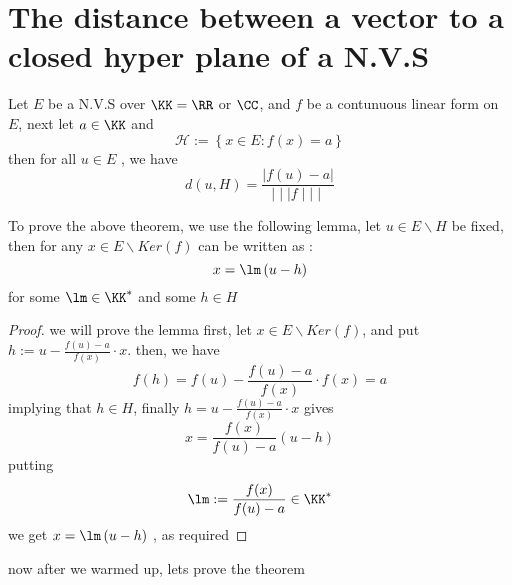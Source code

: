 \section{The distance between a vector to a closed hyper plane of a N.V.S}
\begin{center}
\end{center}
\begin{theorem}[(Ascoli)]
	Let $E $ be a N.V.S over $\KK = \RR  $  or 
	$\CC $, and $f $ be a contunuous linear form on $E $, next let 
	$a \in \KK $  and 
	\[
	\mathcal{H}  := 
	\left\{ x \in E : f(x) = a\right\}
	\]
	then for all $u \in E $ , we have 
	\[
	d \left( u,H \right) = 
	\frac{\left| f(u) -a \right|}{\mid \mid \mid  f \mid \mid \mid }
	\]
\end{theorem}
To prove the above theorem, we use the following lemma, let
$u \in E \backslash H $  be fixed, 
then for any $x \in E \backslash Ker (f)  $  can be written as : 
\[
x = \lm \left( u -h \right)
\]
for some $\lm \in \KK^{*} $  and some $h \in H $ 
\begin{proof}
	we will prove the lemma first, let $x \in E \backslash Ker (f)  $, and
	put $h := u - \frac{f(u)  -a }{ f(x) } \cdot x$. then, we have 
	\[
	f(h) = f(u)  - 
	\frac{f(u) - a}{f(x) } \cdot f(x)  = a
	\]
	implying that $h \in H $, finally $h = u - \frac{f(u) - a}{f(x) } \cdot x $  gives 
	\[
	x = \frac{f(x) }{f(u)  -a } \left( u-h \right)
	\]
	putting 
	\[
	\lm := \frac{f(x) }{ f(u)  -a }\in  \KK^{*}  
	\]
	we get 
	$x = \lm \left( u-h \right) $ , as required
\end{proof}
now after we warmed up, lets prove the theorem 
